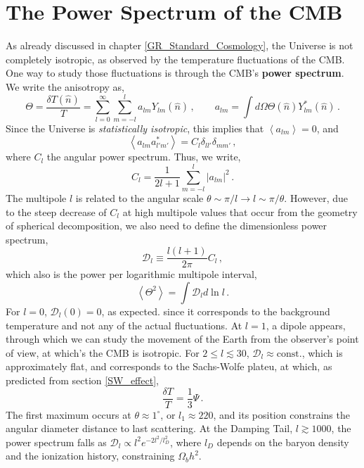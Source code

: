 \documentclass{book}
\begin{document}
	\section{The Power Spectrum of the CMB}
	As already discussed in chapter \ref{GR_Standard_Cosmology}, the Universe is not completely isotropic, as observed by the temperature fluctuations of the CMB. One way to study those fluctuations is through the CMB's \textbf{power spectrum}. We write the anisotropy as,
	\begin{equation}
		\Theta=\frac{\delta T(\hat n)}{T}=\sum_{l=0}^{\infty}\sum_{m=-l}^{l}a_{lm}Y_{lm}(\hat n) \, , \qquad a_{lm}=\int d\Omega \Theta(\hat n) Y^*_{lm}(\hat n) \, .
	\end{equation}
	Since the Universe is \textit{statistically isotropic}, this implies that $\left\langle a_{lm} \right\rangle=0$, and 
	\begin{equation}
		\left\langle a_{lm} a^*_{l'm'}\right\rangle = C_l \delta_{ll'} \delta_{mm'} \, ,
	\end{equation}
	where $C_l$ the angular power spectrum. Thus, we write,
	\begin{equation}
		C_l=\frac{1}{2l+1}\sum_{m=-l}^{l} |a_{lm}|^2 \, .
	\end{equation}
	The multipole $l$ is related to the angular scale $\theta \sim \pi/l \to l\sim\pi/\theta$. However, due to the steep decrease of $C_l$ at high multipole values that occur from the geometry of spherical decomposition, we also need to define the dimensionless power spectrum,
	\begin{equation}
		\mathcal{D}_l\equiv\frac{l(l+1)}{2\pi}C_l \, ,
	\end{equation}
	which also is the power per logarithmic multipole interval,
	\begin{equation}
		\left\langle \Theta^2 \right\rangle = \int \mathcal{D}_l d \ln l \, .
	\end{equation}
	For $l=0$, $\mathcal{D}_l(0)=0$, as expected. since it corresponds to the background temperature and not any of the actual fluctuations. At $l=1$, a dipole appears, through which we can study the movement of the Earth from the observer's point of view, at which's the CMB is isotropic. For $2\leq l \lesssim 30$, $\mathcal{D}_l\approx \text{const.}$, which is approximately flat, and corresponds to the Sachs-Wolfe plateu, at which, as predicted from section \ref{SW_effect}, 
	\begin{equation}
		\frac{\delta T}{T}=\frac13 \Psi \, .
	\end{equation}
	The first maximum occurs at $\theta \approx 1^\circ$, or $l_1 \approx 220$, and its position constrains the angular diameter distance to last scattering. At the Damping Tail, $l\gtrsim 1000$, the power spectrum falls as $\mathcal{D}_l\propto l^2 e^{-2l^2/l^2_D}$, where $l_D$ depends on the baryon density and the ionization history, constraining $\Omega_bh^2$.
	
\end{document}
